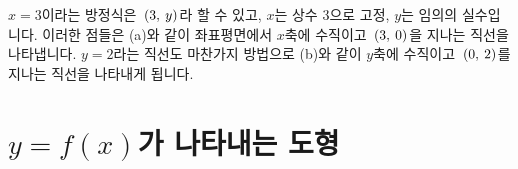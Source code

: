 	
	$x=3$이라는 방정식은 $\mathrm{}\left(3,\:y\right)$라 할 수 있고, $x$는 상수 $3$으로 고정, $y$는 임의의 실수입니다. 이러한 점들은 (a)와 같이 좌표평면에서 $x$축에 수직이고 $\mathrm{}\left(3,\:0\right)$을 지나는 직선을 나타냅니다. $y=2$라는 직선도 마찬가지 방법으로 (b)와 같이 $y$축에 수직이고 $\mathrm{}\left(0,\:2\right)$를 지나는 직선을 나타내게 됩니다.
\clearpage
\section{$y=f\left( x \right) $가 나타내는 도형}

\begin{figure}[h]
	\centering {}\
	\qquad\qquad
	\centering {}\
	\end{figure}

